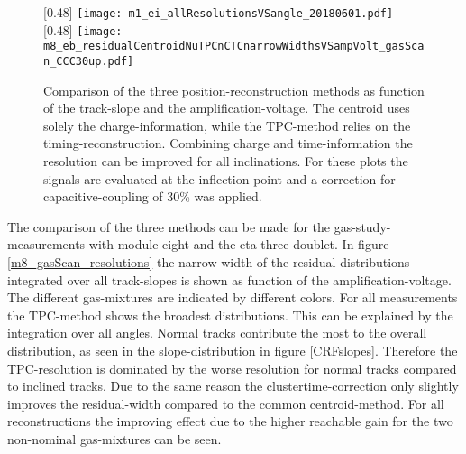 \documentclass[
twoside,            %
BCOR1.4cm,          %
10pt,               %
headings=normal,    %
headsepline,        %
clearplainpage,		%
final,              %
div=14,
open=right,
bibliography=toc
]{scrreprt}
\begin{document}
\begin{figure}[!h]
	\centering
	[0.48\textwidth]
	{\texttt{[image: m1\_ei\_allResolutionsVSangle\_20180601.pdf]}}
	\hfill
	[0.48\textwidth]
	{\texttt{[image: m8\_eb\_residualCentroidNuTPCnCTCnarrowWidthsVSampVolt\_gasScan\_CCC30up.pdf]}}
	\vspace{-2mm}
	\caption{
		Comparison of the three position-reconstruction methods as function of the track-slope and the amplification-voltage.
		The centroid uses solely the charge-information, while the \textmu TPC-method relies on the timing-reconstruction.
		Combining charge and time-information the resolution can be improved for all inclinations.
		For these plots the signals are evaluated at the inflection point and a correction for capacitive-coupling of 30\% was applied.
	}
\end{figure}

The comparison of the three methods can be made for the gas-study-measurements with module eight and the eta-three-doublet.
In figure \ref{m8_gasScan_resolutions} the narrow width of the residual-distributions integrated over all track-slopes is shown as function of the amplification-voltage.
The different gas-mixtures are indicated by different colors.
For all measurements the \textmu TPC-method shows the broadest distributions.
This can be explained by the integration over all angles.
Normal tracks contribute the most to the overall distribution, as seen in the slope-distribution in figure \ref{CRFslopes}.
Therefore the \textmu TPC-resolution is dominated by the worse resolution for normal tracks compared to inclined tracks.
Due to the same reason the clustertime-correction only slightly improves the residual-width compared to the common centroid-method.
For all reconstructions the improving effect due to the higher reachable gain for the two non-nominal gas-mixtures can be seen.
\end{document}
